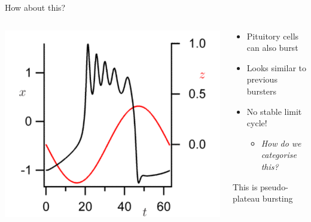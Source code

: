 \documentclass[presentation]{beamer}
\begin{document}
\begin{frame}[label={sec:orga6d673f}]{How about this?}
\begin{columns}
\begin{column}{0.5\columnwidth}
\begin{center}
\includegraphics[width=.9\linewidth]{./PPB.png}
\end{center}
\end{column}

\begin{column}{0.5\columnwidth}
\begin{itemize}
\item Pituitory cells can also burst
\item Looks similar to previous bursters
\item No stable limit cycle!
\begin{itemize}
\item \alert{\emph{How do we categorise this?}}
\end{itemize}
\end{itemize}

\vfill

This is pseudo-plateau bursting
\end{column}
\end{columns}
\end{frame}
\end{document}
